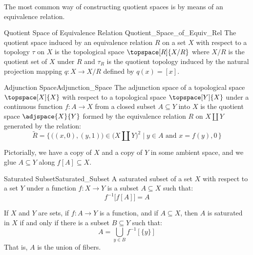     The most common way of constructing quotient spaces is by means of an
    equivalence relation.
    \begin{fdefinition}{Quotient Space of Equivalence Relation}
                       {Quotient_Space_of_Equiv_Rel}
        The quotient space induced by an equivalence relation $R$ on a set
        $X$ with respect to a topology $\tau$ on $X$ is the topological
        space $\topspace[R]{X/R}$ where $X/R$ is the quotient set of $X$
        under $R$ and $\tau_{R}$ is the quotient topology induced by the
        natural projection mapping $q:X\rightarrow{X}/R$ defined by
        $q(x)=[x]$.
    \end{fdefinition}
    \begin{fdefinition}{Adjunction Space}{Adjunction_Space}
        The adjunction space of a topological space $\topspace[X]{X}$
        with respect to a topological space $\topspace[Y]{X}$ under a
        continuous function $f:A\rightarrow{X}$ from a closed subset
        $A\subseteq{Y}$ into $X$ is the quotient space
        $\adjspace{X}{Y}$ formed by the equivalence relation $R$ on
        $X\coprod{Y}$ generated by the relation:
        \begin{equation*}
            \tilde{R}=
                \Big\{\,
                    \big((x,0),(y,1)\big)\in\big(X\coprod{Y}\big)^{2}\;|\;
                    y\in{A}\textrm{ and }x=f(y),0\,
                \Big\}
        \end{equation*}
    \end{fdefinition}
    Pictorially, we have a copy of $X$ and a copy of $Y$ in some ambient
    space, and we glue $A\subseteq{Y}$ along $f[A]\subseteq{X}$.
    \begin{fdefinition}{Saturated Subset}{Saturated_Subset}
        A saturated subset of a set $X$ with respect to a set $Y$ under a
        function $f:X\rightarrow{Y}$ is a subset $A\subseteq{X}$ such that:
        \begin{equation*}
            f^{\minus{1}}\big[f[A]\big]=A
        \end{equation*}
    \end{fdefinition}
    \begin{theorem}
        If $X$ and $Y$ are sets, if $f:A\rightarrow{Y}$ is a function, and
        if $A\subseteq{X}$, then $A$ is saturated in $X$ if and only if
        there is a subset $B\subseteq{Y}$ such that:
        \begin{equation}
            A=\bigcup_{y\in{B}}f^{\minus{1}}[\{y\}]
        \end{equation}
        That is, $A$ is the union of fibers.
    \end{theorem}
